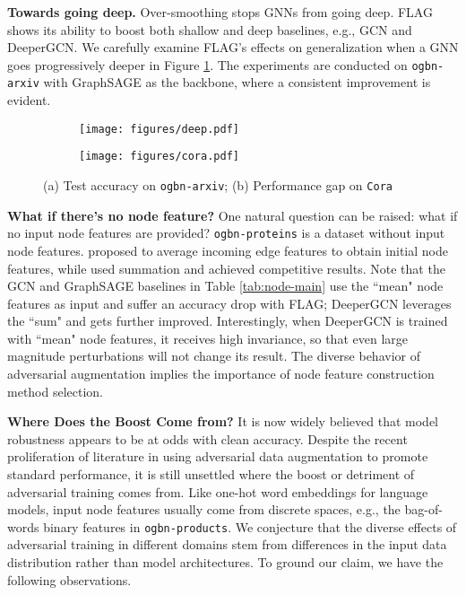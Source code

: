 \documentclass[11pt]{article}
\begin{document}
{\bf Towards going deep.} Over-smoothing stops GNNs from going deep. FLAG shows its ability to boost both shallow and deep baselines, e.g., GCN and DeeperGCN. We carefully examine FLAG's effects on generalization when a GNN goes progressively deeper in Figure \ref{fig:deep-cora1}. The experiments are conducted on \texttt{ogbn-arxiv} with GraphSAGE as the backbone, where a consistent improvement is evident.




\begin{figure*}[ht]\small
    \centering
    \begin{subfigure}{.4\textwidth}
        \texttt{[image: figures/deep.pdf]} 
        \caption{}
        \label{fig:deep-cora1}
    \end{subfigure}\begin{subfigure}{.4\textwidth}
        \texttt{[image: figures/cora.pdf]}\caption{}
        \label{fig:deep-cora2}
    \end{subfigure}\caption{(a) Test accuracy on \texttt{ogbn-arxiv}; (b) Performance gap on \texttt{Cora}}\end{figure*}

{\bf What if there's no node feature?} One natural question can be raised: what if no input node features are provided? \texttt{ogbn-proteins} is a dataset without input node features. \citet{hu2020open} proposed to average incoming edge features to obtain initial node features, while \cite{li2020deepergcn} used summation and achieved competitive results. Note that the GCN and GraphSAGE baselines in Table \ref{tab:node-main} use the ``mean" node features as input and suffer an accuracy drop with FLAG; DeeperGCN leverages the ``sum" and gets further improved. Interestingly, when DeeperGCN is trained with ``mean" node features, it receives high invariance, so that even large magnitude perturbations will not change its result. The diverse behavior of adversarial augmentation implies the importance of node feature construction method selection. 

{\bf Where Does the Boost Come from?} It is now widely believed that model robustness appears to be at odds with clean accuracy. Despite the recent proliferation of literature in using adversarial data augmentation to promote standard performance, it is still unsettled where the boost or detriment of adversarial training comes from. Like one-hot word embeddings for language models, input node features usually come from discrete spaces, e.g., the bag-of-words binary features in \texttt{ogbn-products}. We conjecture that the diverse effects of adversarial training in different domains stem from differences in the input data distribution rather than model architectures. To ground our claim, we have the following observations. 
\end{document}
